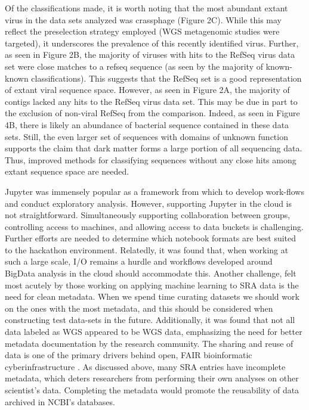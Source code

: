 Of the classifications made, it is worth noting that the most abundant extant
virus in the data sets analyzed was crassphage (Figure 2C). While this may
reflect the preselection strategy employed (WGS metagenomic studies were
targeted), it underscores the prevalence of this recently identified virus.
Further, as seen in Figure 2B, the majority of viruses with hits to the RefSeq
virus data set were close matches to a refseq sequence (as seen by the majority
of known-known classifications). This suggests that the RefSeq set is a good
representation of extant viral sequence space. However, as seen in Figure 2A,
the majority of contigs lacked any hits to the RefSeq virus data set. This may
be due in part to the exclusion of non-viral RefSeq from the comparison.
Indeed, as seen in Figure 4B, there is likely an abundance of bacterial
sequence contained in these data sets. Still, the even larger set of sequences
with domains of unknown function supports the claim that dark matter forms a
large portion of all sequencing data. Thus, improved methods for classifying
sequences without any close hits among extant sequence space are needed.

Jupyter \cite{jupyterNotebook} was immensely popular as a framework from which
to develop work-flows and conduct exploratory analysis. However, supporting
Jupyter in the cloud is not straightforward. Simultaneously supporting
collaboration between groups, controlling access to machines, and allowing
access to data buckets is challenging. Further efforts are needed to determine
which notebook formats are best suited to the hackathon environment. Relatedly,
it was found that, when working at such a large scale, I/O remains a hurdle and
workflows developed around BigData analysis in the cloud should accommodate
this. Another challenge, felt most acutely by those working on applying machine
learning to SRA data is the need for clean metadata. When we spend time
curating datasets we should work on the ones with the most metadata, and this
should be considered when constructing test data-sets in the future.
Additionally, it was found that not all data labeled as WGS appeared to be WGS
data, emphasizing the need for better metadata documentation by the research
community. The sharing and reuse of data is one of the primary drivers behind
open, FAIR bioinformatic cyberinfrastructure \cite{Wilkinson2016}. As discussed
above, many SRA entries have incomplete metadata, which deters researchers from
performing their own analyses on other scientist’s data. Completing the
metadata would promote the reusability of data archived in NCBI’s databases.

